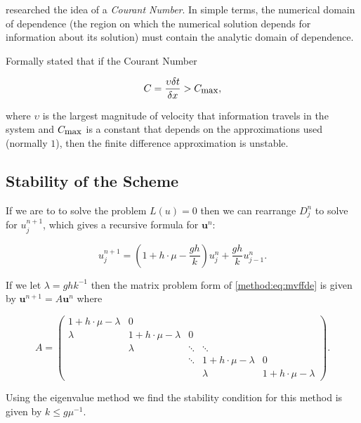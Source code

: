 \documentclass[../main.tex]{subfiles}
\begin{document}
  \cite{courant1928} researched the idea of a \emph{Courant Number}. In simple terms, the numerical domain of dependence (the region on which the numerical solution depends for information about its solution) must contain the analytic domain of dependence.

  Formally \cite{courant1928} stated that if the Courant Number

  \begin{equation}
    C = \frac{\upsilon \delta t}{\delta x} > C_{\mbox{\small max}},
  \end{equation}

  where $\upsilon$ is the largest magnitude of velocity that information travels in the system and $C_{\mbox{\small max}}$ is a constant that depends on the approximations used (normally $1$), then the finite difference approximation is unstable.

  \subsection{Stability of the Scheme}
  If we are to to solve the problem $L(u) = 0$ then we can rearrange $D^n_j$ to solve for $u^{n+1}_j$, which gives a recursive formula for $\mathbf{u}^n$:

  \begin{equation} \label{method:eq:mvffde}
    u^{n+1}_j = \left(1 + h \cdot \mu - \frac{gh}{k} \right) u^n_j + \frac{gh}{k} u^n_{j-1}.
  \end{equation}

  If we let $\lambda = gh k^{-1}$ then the matrix problem form of \autoref{method:eq:mvffde} is given by $\mathbf{u}^{n+1} = A \mathbf{u}^n$ where

  \begin{equation}\label{method:eq:noboundary}
    A = \begin{pmatrix}
      1 + h \cdot \mu - \lambda & 0 & \\
      \lambda & 1 + h \cdot \mu - \lambda & 0 \\
        & \lambda & \ddots & \ddots & \\
        &   & \ddots & 1 + h \cdot \mu - \lambda & 0 \\
        &   &        & \lambda & 1 + h \cdot \mu - \lambda
    \end{pmatrix}.
  \end{equation}

  Using the eigenvalue method we find the stability condition for this method is given by $k \leq g \mu^{-1}$.
\end{document}
